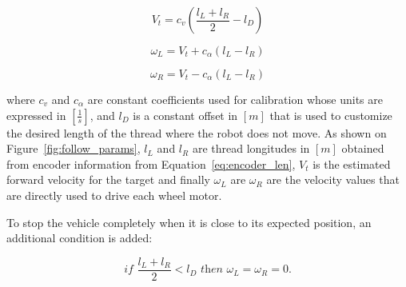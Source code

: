 \documentclass[journal]{IEEEtran}
\begin{document}
\begin{equation}
V_t = c_v (\frac{l_L + l_R}{2} - l_D)
\label{eq:lemniscata}
\end{equation}

\begin{equation}
\omega_{L} = V_t + c_{\alpha} (l_L - l_R)
\label{eq:lemniscata2}
\end{equation}

\begin{equation}
\omega_{R} = V_t - c_{\alpha} (l_L - l_R)
\label{eq:lemniscata3}
\end{equation}

\noindent where  $c_v$ and $c_{\alpha}$ are constant coefficients used for calibration whose units are expressed in $[\frac{1}{s}]$, and $l_D$ is a constant offset in $[m]$ that is used to customize the desired length of the thread where the robot does not move.   As shown on Figure~\ref{fig:follow_params},  $l_L$ and $l_R$ are thread longitudes in $[m]$  obtained from encoder information from Equation~\ref{eq:encoder_len}, $V_t$ is the estimated forward velocity for the target and finally $\omega_{L}$ are $\omega_{R}$ are the velocity values that are directly used to drive each wheel motor.

To stop the vehicle completely when it is close to its expected position, an additional condition is added: 

\begin{equation}
\textit{if  }{\frac{l_L + l_R}{2} < l_D}\textit{ then } \omega_{L} = \omega_{R} = 0.
\end{equation}
\end{document}

